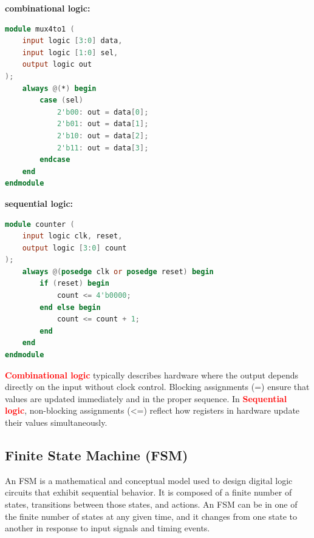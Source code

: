 \documentclass{article}
\begin{document}
\begin{multicols}{2}
    \textbf{combinational logic:}\\

    \begin{lstlisting}[language=Verilog,frame=single,backgroundcolor=\color{White},basicstyle=\color{LightGreen},showspaces=false,showstringspaces=false]
module mux4to1 (
    input logic [3:0] data,
    input logic [1:0] sel,
    output logic out
);
    always @(*) begin
        case (sel)
            2'b00: out = data[0];
            2'b01: out = data[1];
            2'b10: out = data[2];
            2'b11: out = data[3];
        endcase
    end
endmodule
    \end{lstlisting}
    \columnbreak
    \textbf{sequential logic:}\\

    \begin{lstlisting}[language=Verilog,frame=single,backgroundcolor=\color{White},basicstyle=\color{LightGreen},showspaces=false,showstringspaces=false]
module counter (
    input logic clk, reset,
    output logic [3:0] count
);
    always @(posedge clk or posedge reset) begin
        if (reset) begin
            count <= 4'b0000;
        end else begin
            count <= count + 1;
        end
    end
endmodule
    \end{lstlisting}
\end{multicols}

\textcolor{red}{\textbf{Combinational logic}} typically describes hardware where the output depends directly on the input without clock control. Blocking assignments (=) ensure that values are updated immediately and in the proper sequence. In \textcolor{red}{\textbf{Sequential logic}}, non-blocking assignments (\textless =) reflect how registers in hardware update their values simultaneously.

\subsection{Finite State Machine (FSM)}
An FSM is a mathematical and conceptual model used to design digital logic circuits that exhibit sequential behavior. It is composed of a finite number of states, transitions between those states, and actions. An FSM can be in one of the finite number of states at any given time, and it changes from one state to another in response to input signals and timing events.
\end{document}
